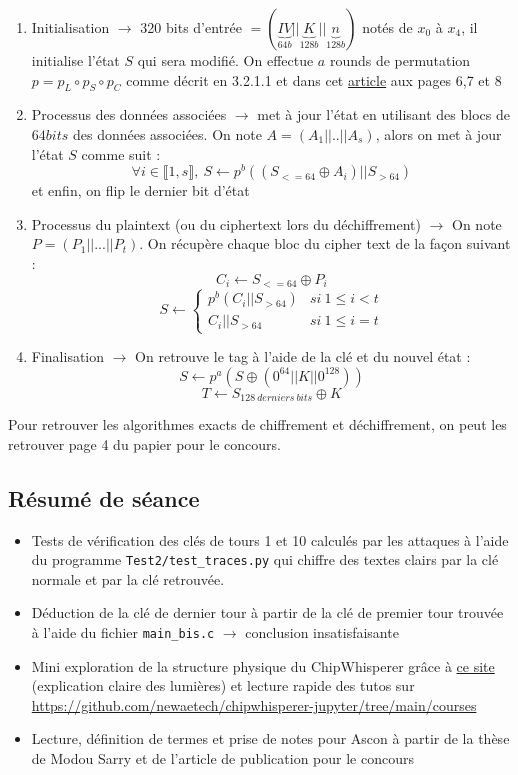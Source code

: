\documentclass[12pt]{article}
\begin{document}
	\begin{enumerate}
		\item Initialisation $\rightarrow$ 320 bits d'entrée $=(\underbrace{IV}_{64b}||\underbrace{K}_{128b}||\underbrace{n}_{128b})$ notés de $x_0$ à $x_4$, il initialise l'état $S$ qui sera modifié. On effectue $a$ rounds de permutation $p = p_L \circ p_S \circ p_C$ comme décrit en 3.2.1.1 et dans cet \href{https://competitions.cr.yp.to/round3/asconv12.pdf}{article} aux pages 6,7 et 8
		\item Processus des données associées $\rightarrow$ met à jour l'état en utilisant des blocs de $64bits$ des données associées. On note $A=(A_1||..||A_s)$, alors on met à jour l'état $S$ comme suit :
		$$\forall i \in \llbracket 1,s \rrbracket,\  S \leftarrow p^b((S_{<=64} \oplus A_i)||S_{>64})$$
		et enfin, on flip le dernier bit d'état
		\item Processus du plaintext (ou du ciphertext lors du déchiffrement) $\rightarrow$ On note $P = (P_1 || ... || P_t)$. On récupère chaque bloc du cipher text de la façon suivant :
		$$C_i \leftarrow S_{<=64} \oplus P_i$$
		$$S \leftarrow \left \{	\begin{array}{ll}
			p^b(C_i||S_{>64}) & si\ 1 \le i < t \\
			C_i||S_{>64} & si\ 1 \le i = t
		\end{array}
		\right.$$
		\item Finalisation $\rightarrow$ On retrouve le tag à l'aide de la clé et du nouvel état :
		$$S \leftarrow p^a(S \oplus (0^{64} || K || 0^{128}))$$
		$$T \leftarrow S_{128\ derniers\ bits} \oplus K$$
	\end{enumerate}
	Pour retrouver les algorithmes exacts de chiffrement et déchiffrement, on peut les retrouver page 4 du papier pour le concours.
	
	\subsection{Résumé de séance}
	\begin{itemize}
		\item Tests de vérification des clés de tours 1 et 10 calculés par les attaques à l'aide du programme \verb|Test2/test_traces.py| qui chiffre des textes clairs par la clé normale et par la clé retrouvée.
		\item Déduction de la clé de dernier tour à partir de la clé de premier tour trouvée à l'aide du fichier \verb|main_bis.c| $\rightarrow$ conclusion insatisfaisante
		\item Mini exploration de la structure physique du ChipWhisperer grâce à \href{https://www.robopenguins.com/chip-whisperer/}{ce site} (explication claire des lumières) et lecture rapide des tutos sur \url{https://github.com/newaetech/chipwhisperer-jupyter/tree/main/courses}
		\item Lecture, définition de termes et prise de notes pour Ascon à partir de la thèse de Modou Sarry et de l'article de publication pour le concours
	\end{itemize}
	
\end{document}
